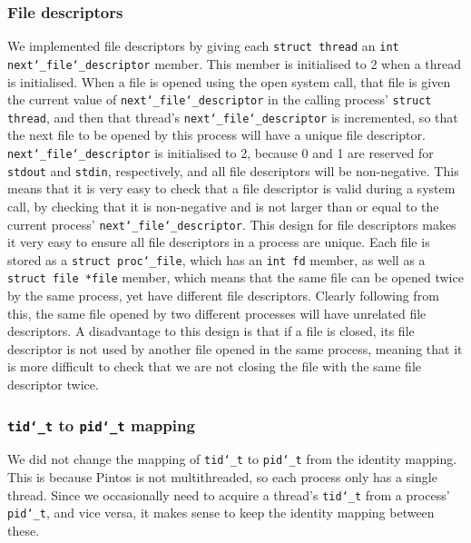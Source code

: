 \documentclass{article}
\renewcommand{\_}{\char`_}
\begin{document}
\subsubsection{File descriptors}

We implemented file descriptors by giving each \texttt{struct thread} an \texttt{int next\_file\_descriptor} member. This member is initialised to 2 when a thread is initialised. When a file is opened using the open system call, that file is given the current value of \texttt{next\_file\_descriptor} in the calling process' \texttt{struct thread}, and then that thread's \texttt{next\_file\_descriptor} is incremented, so that the next file to be opened by this process will have a unique file descriptor. \texttt{next\_file\_descriptor} is initialised to 2, because 0 and 1 are reserved for \texttt{stdout} and \texttt{stdin}, respectively, and all file descriptors will be non-negative. This means that it is very easy to check that a file descriptor is valid during a system call, by checking that it is non-negative and is not larger than or equal to the current process' \texttt{next\_file\_descriptor}. This design for file descriptors makes it very easy to ensure all file descriptors in a process are unique. Each file is stored as a \texttt{struct proc\_file}, which has an \texttt{int fd} member, as well as a \texttt{struct file *file} member, which means that the same file can be opened twice by the same process, yet have different file descriptors. Clearly following from this, the same file opened by two different processes will have unrelated file descriptors. A disadvantage to this design is that if a file is closed, its file descriptor is not used by another file opened in the same process, meaning that it is more difficult to check that we are not closing the file with the same file descriptor twice.

\subsubsection{\texttt{tid\_t} to \texttt{pid\_t} mapping}

We did not change the mapping of \texttt{tid\_t} to \texttt{pid\_t} from the identity mapping. This is because Pintos is not multithreaded, so each process only has a single thread. Since we occasionally need to acquire a thread's \texttt{tid\_t} from a process' \texttt{pid\_t}, and vice versa, it makes sense to keep the identity mapping between these.

\end{document}
